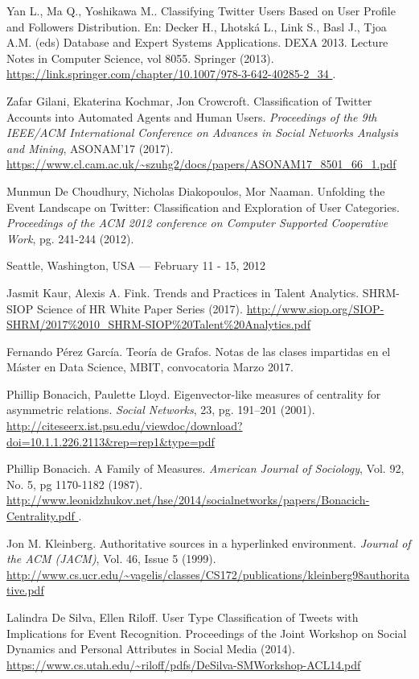 \begin{thebibliography}{3}
 Yan L., Ma Q., Yoshikawa M.. Classifying Twitter Users Based on User Profile and Followers Distribution. En: Decker H., Lhotská L., Link S., Basl J., Tjoa A.M. (eds) Database and Expert Systems Applications. DEXA 2013. Lecture Notes in Computer Science, vol 8055. Springer (2013).
\url{https://link.springer.com/chapter/10.1007/978-3-642-40285-2_34 }.

 Zafar Gilani, Ekaterina Kochmar, Jon Crowcroft. Classification 
of Twitter Accounts into Automated Agents and Human Users.
{\em Proceedings of the 9th IEEE/ACM International Conference on Advances in 
Social Networks Analysis and Mining}, ASONAM'17 (2017).
\url{https://www.cl.cam.ac.uk/~szuhg2/docs/papers/ASONAM17_8501_66_1.pdf }

 Munmun De Choudhury, Nicholas Diakopoulos,
Mor Naaman. Unfolding the Event Landscape on Twitter:
Classification and Exploration of User Categories. 
{\em Proceedings of the ACM 2012 conference on Computer Supported Cooperative 
Work}, pg. 241-244 (2012).
\url{}

Seattle, Washington, USA — February 11 - 15, 2012 

 Jasmit Kaur, Alexis A. Fink. Trends and Practices in Talent
Analytics. SHRM-SIOP Science of HR White Paper Series (2017).
\url{http://www.siop.org/SIOP-SHRM/2017%2010_SHRM-SIOP%20Talent%20Analytics.pdf }

 Fernando Pérez García. Teoría de Grafos. Notas de las clases
impartidas en el Máster en Data Science, MBIT, convocatoria Marzo 2017.

 Phillip Bonacich, Paulette Lloyd. 
Eigenvector-like measures of centrality for asymmetric relations.
{\em Social Networks}, 23, pg. 191–201 (2001).
\url{http://citeseerx.ist.psu.edu/viewdoc/download?doi=10.1.1.226.2113&rep=rep1&type=pdf }

 Phillip Bonacich. A Family of Measures. {\em American Journal 
of Sociology}, Vol. 92, No. 5, pg 1170-1182 (1987). 
\url{http://www.leonidzhukov.net/hse/2014/socialnetworks/papers/Bonacich-Centrality.pdf }.

Jon M. Kleinberg. Authoritative sources in a hyperlinked environment.
{\em Journal of the ACM (JACM)}, Vol. 46, Issue 5 (1999).
\url{http://www.cs.ucr.edu/~vagelis/classes/CS172/publications/kleinberg98authoritative.pdf } 


 Lalindra De Silva, Ellen Riloff. User Type Classification of Tweets with Implications 
for Event Recognition. Proceedings of the Joint Workshop on Social Dynamics and Personal Attributes 
in Social Media (2014).
\url{https://www.cs.utah.edu/~riloff/pdfs/DeSilva-SMWorkshop-ACL14.pdf }


\end{thebibliography}
